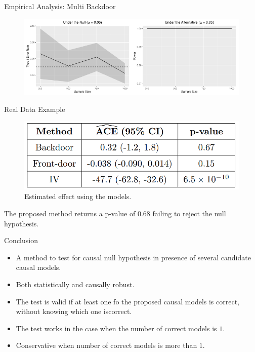 \documentclass{beamer}
\begin{document}
\begin{frame}{Empirical Analysis: Multi Backdoor}
	\begin{figure}
		\center
		\includegraphics[scale=0.45]{multi_back.png}
	\end{figure}
\end{frame}

\begin{frame}{Real Data Example}
	\begin{figure}
		\center
		\includegraphics[scale=0.2]{table.png}
		\caption*{Estimated effect using the models.}
	\end{figure}

	The proposed method returns a p-value of 0.68 failing to reject the null hypothesis.
\end{frame}

\begin{frame}{Conclusion}
	\begin{itemize}
		\item A method to test for causal null hypothesis in presence of several candidate causal models.
		\item Both statistically and causally robust.
		\item The test is valid if at least one fo the proposed causal models is correct, without knowing which one iscorrect.
		\item The test works in the case when the number of correct models is $1$.
		\item Conservative when number of correct models is more than $1$.
	\end{itemize}
\end{frame}
\end{document}
